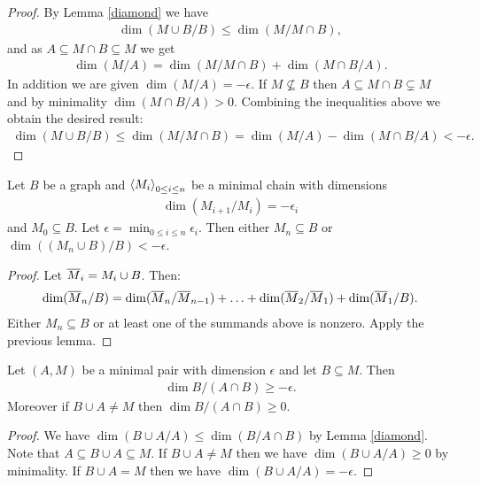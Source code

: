 \begin{proof}
  By Lemma \ref{diamond} we have
  \begin{align*}
    \dim(M \cup B/B) \leq \dim(M / M \cap B),
  \end{align*}
  and as $A \subseteq M \cap B \subseteq M$ we get
  \begin{align*}
    \dim (M/A) = \dim(M / M \cap B) + \dim(M \cap B / A).
  \end{align*}
  In addition we are given $\dim (M/A) = -\epsilon$.
  If $M \not\subseteq B$ then $A \subseteq M \cap B \subsetneq M$ and by minimality $\dim(M \cap B / A) > 0$.
  Combining the inequalities above we obtain the desired result:
  \begin{align*}
    \dim(M \cup B/B) \leq \dim(M / M \cap B) = \dim (M/A) - \dim(M \cap B / A) < -\epsilon.
  \end{align*}
\end{proof}

\begin{Lemma}	\label{chain_lemma}
  Let $B$ be a graph and $\left\langle M_i \right\rangle_{0 \leq i \leq n}$ be a minimal chain with dimensions
  \begin{align*}
    \dim(M_{i+1}/M_i) = -\epsilon_i
  \end{align*}
  and $M_0 \subseteq B$.
  Let $\epsilon = \min_{0 \leq i \leq n} \epsilon_i$.
  Then either $M_n \subseteq B$ or $\dim((M_n \cup B)/B) < -\epsilon$.
\end{Lemma}

\begin{proof}
  Let ${\overline{M}}_i = M_i \cup B$. Then:
  \begin{align*}
    \dim({\overline{M}}_n/B) = \dim({\overline{M}}_n/{\overline{M}}_{n-1}) + \ldots + \dim({\overline{M}}_2/{\overline{M}}_1) + \dim({\overline{M}}_1/B).
  \end{align*}
  Either $M_n \subseteq B$ or at least one of the summands above is nonzero.
  Apply the previous lemma.
\end{proof}

\begin{Lemma} \label{minimal_subset}
  Let $(A, M)$ be a minimal pair with dimension $\epsilon$ and let $B \subseteq M$.
  Then
  \begin{align*}
    \dim B / (A \cap B) \geq -\epsilon.    
  \end{align*}
  Moreover if $B \cup A \neq M$ then $\dim B / (A \cap B) \geq 0$.
\end{Lemma}

\begin{proof}
  We have $\dim (B \cup A / A) \leq \dim (B / A \cap B)$ by Lemma \ref{diamond}.
  Note that $A \subseteq B \cup A \subseteq M$.
  If $B \cup A \neq M$ then we have $\dim (B \cup A / A) \geq 0$ by minimality.
  If $B \cup A = M$ then we have $\dim (B \cup A / A) = -\epsilon$.
\end{proof}


